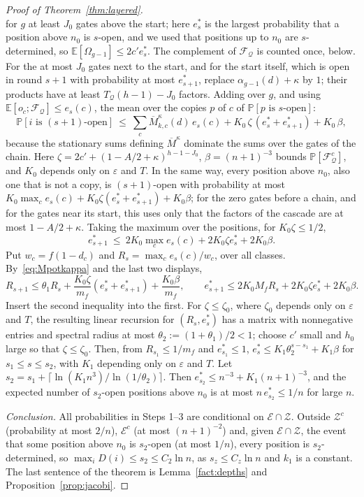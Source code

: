 \documentclass[11pt]{amsart}
\theoremstyle{definition}
\theoremstyle{remark}
\newcommand{\eps}{\varepsilon}
\newcommand{\PP}{\mathbb{P}}
\newcommand{\EE}{\mathbb{E}}
\begin{document}
\begin{proof}[Proof of Theorem~\ref{thm:layered}]
\[\]
for $g$ at least $J_0$ gates above the start; here
$e^*_s$ is the largest probability that a position above $n_0$ is $s$-open, and we used that
positions up to $n_0$ are $s$-determined, so $\EE[\Omega_{g-1}]\le2c'e^*_s$. The complement of
$\mathcal F_{\mathcal Q}$ is counted once, below. For the at most $J_0$ gates
next to the start, and for the start itself, which is open in round $s+1$ with probability at most
$e^*_{s+1}$, replace $\alpha_{g-1}(d)+\kappa$ by $1$; their products have at least
$T_{\mathcal Q}(h-1)-J_0$ factors. Adding over $g$, and using
$\EE[o_c;\mathcal F_{\mathcal Q}]\le e_s(c)$, the mean over the copies $p$ of $c$ of
$\PP[p\text{ is }s\text{-open}]$:
\[
\PP[i\text{ is }(s+1)\text{-open}]\ \le\ \sum_c\overline M^\kappa_{k,c}(d)\,e_s(c)+K_0\,\zeta\,(e^*_s+e^*_{s+1})+K_0\,\beta,
\]
because the stationary sums defining $\overline M^\kappa$ dominate the sums over the gates of the
chain. Here $\zeta=2c'+(1-A/2+\kappa)^{h-1-J_0}$, $\beta=(n+1)^{-3}$ bounds
$\PP[\mathcal F^c_{\mathcal Q}]$, and $K_0$ depends only on $\eps$ and $T$. In the same way, every
position above $n_0$, also one that is not a copy, is $(s+1)$-open with probability at most
$K_0\max_ce_s(c)+K_0\zeta(e^*_s+e^*_{s+1})+K_0\beta$; for the zero gates before a chain, and for
the gates near its start, this uses only that the factors of the cascade are at most $1-A/2+\kappa$.
Taking the maximum over the positions, for $K_0\zeta\le1/2$,
\[
e^*_{s+1}\ \le\ 2K_0\max_ce_s(c)+2K_0\zeta e^*_s+2K_0\beta .
\]
Put $w_c=f(1-d_c)$ and $R_s=\max_ce_s(c)/w_c$, over all classes. By~\eqref{eq:Mpotkappa} and the last
two displays,
\[
R_{s+1}\le\theta_1R_s+\frac{K_0\zeta}{m_f}(e^*_s+e^*_{s+1})+\frac{K_0\beta}{m_f},\qquad
e^*_{s+1}\le2K_0M_fR_s+2K_0\zeta e^*_s+2K_0\beta .
\]
Insert the second inequality into the first. For $\zeta\le\zeta_0$, where $\zeta_0$ depends only on
$\eps$ and $T$, the resulting linear recursion for $(R_s,e^*_s)$ has a matrix with nonnegative
entries and spectral radius at most $\theta_2:=(1+\theta_1)/2<1$; choose $c'$ small and $h_0$ large
so that $\zeta\le\zeta_0$. Then, from $R_{s_1}\le1/m_f$ and $e^*_{s_1}\le1$,
$e^*_s\le K_1\theta_2^{s-s_1}+K_1\beta$ for $s_1\le s\le s_2$, with $K_1$ depending only on $\eps$
and $T$. Let $s_2=s_1+\lceil\ln(K_1n^3)/\ln(1/\theta_2)\rceil$. Then
$e^*_{s_2}\le n^{-3}+K_1(n+1)^{-3}$, and the expected number of $s_2$-open positions above $n_0$ is
at most $n\,e^*_{s_2}\le1/n$ for large $n$.

\emph{Conclusion.} All probabilities in Steps 1--3 are conditional on $\mathcal E\cap\mathcal Z$.
Outside $\mathcal Z^c$ (probability at most $2/n$), $\mathcal E^c$ (at most $(n+1)^{-2}$) and, given
$\mathcal E\cap\mathcal Z$, the event that some position above $n_0$ is $s_2$-open (at most $1/n$),
every position is $s_2$-determined, so $\max_iD(i)\le s_2\le C_2\ln n$, as $s_z\le C_z\ln n$ and
$k_1$ is a constant.
The last sentence of the theorem is Lemma~\ref{fact:depths} and Proposition~\ref{prop:jacobi}.
\end{proof}
\end{document}
